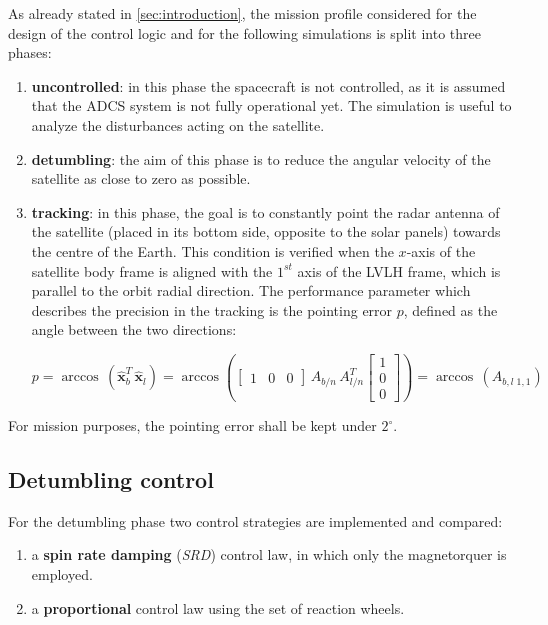 As already stated in \cref{sec:introduction}, the mission profile considered for the design of the control logic and for the following simulations is split into three phases:

\begin{enumerate}
    \item \textbf{uncontrolled}: in this phase the spacecraft is not controlled, as it is assumed that the ADCS system is not fully operational yet. The simulation is useful to analyze the disturbances acting on the satellite.
    \item \textbf{detumbling}: the aim of this phase is to reduce the angular velocity of the satellite as close to zero as possible.
    \item \textbf{tracking}: in this phase, the goal is to constantly point the radar antenna of the satellite (placed in its bottom side, opposite to the solar panels) towards the centre of the Earth. This condition is verified when the $x$-axis of the satellite body frame is aligned with the $1^{st}$ axis of the LVLH frame, which is parallel to the orbit radial direction. The performance parameter which describes the precision in the tracking is the pointing error $p$, defined as the angle between the two directions:
    
    \begin{equation}
        p = \arccos\,(\hat{\mathbf{x}}_b^T\, \hat{\mathbf{x}}_l) = \arccos \left( 
        \begin{bmatrix}
        1 & 0 & 0
        \end{bmatrix}
        \, A_{b/n}\, A_{l/n}^T \begin{bmatrix}
        1 \\
        0 \\
        0 
        \end{bmatrix}
        \right) = \arccos\,(A_{b,l \; 1,1})
    \end{equation}
\end{enumerate}

For mission purposes, the pointing error shall be kept under $2^{\circ}$.

\subsection{Detumbling control}

For the detumbling phase two control strategies are implemented and compared:

\begin{enumerate}
    \item a \textbf{spin rate damping} (\textit{SRD}) control law, in which only the magnetorquer is employed.
    \item a \textbf{proportional} control law using the set of reaction wheels.
\end{enumerate}

